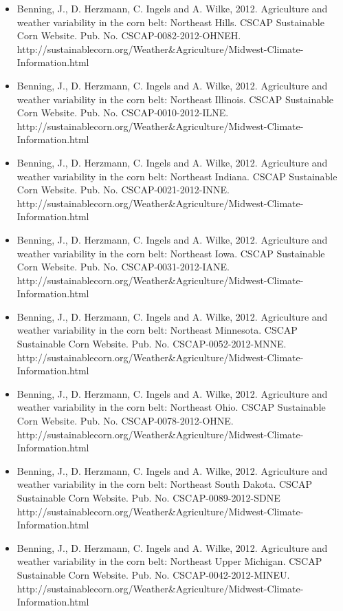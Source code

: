 \begin{itemize}
\item Benning, J., D. Herzmann, C. Ingels and A. Wilke, 2012. Agriculture and weather variability in the corn belt: Northeast Hills. CSCAP Sustainable Corn Website. Pub. No. CSCAP-0082-2012-OHNEH. http://sustainablecorn.org/Weather\&Agriculture/Midwest-Climate-Information.html

\item Benning, J., D. Herzmann, C. Ingels and A. Wilke, 2012. Agriculture and weather variability in the corn belt: Northeast Illinois. CSCAP Sustainable Corn Website. Pub. No. CSCAP-0010-2012-ILNE. http://sustainablecorn.org/Weather\&Agriculture/Midwest-Climate-Information.html

\item Benning, J., D. Herzmann, C. Ingels and A. Wilke, 2012. Agriculture and weather variability in the corn belt: Northeast Indiana. CSCAP Sustainable Corn Website. Pub. No. CSCAP-0021-2012-INNE. http://sustainablecorn.org/Weather\&Agriculture/Midwest-Climate-Information.html

\item Benning, J., D. Herzmann, C. Ingels and A. Wilke, 2012. Agriculture and weather variability in the corn belt: Northeast Iowa. CSCAP Sustainable Corn Website. Pub. No. CSCAP-0031-2012-IANE. http://sustainablecorn.org/Weather\&Agriculture/Midwest-Climate-Information.html

\item Benning, J., D. Herzmann, C. Ingels and A. Wilke, 2012. Agriculture and weather variability in the corn belt: Northeast Minnesota. CSCAP Sustainable Corn Website. Pub. No. CSCAP-0052-2012-MNNE. http://sustainablecorn.org/Weather\&Agriculture/Midwest-Climate-Information.html

\item Benning, J., D. Herzmann, C. Ingels and A. Wilke, 2012. Agriculture and weather variability in the corn belt: Northeast Ohio. CSCAP Sustainable Corn Website. Pub. No. CSCAP-0078-2012-OHNE. http://sustainablecorn.org/Weather\&Agriculture/Midwest-Climate-Information.html

\item Benning, J., D. Herzmann, C. Ingels and A. Wilke, 2012. Agriculture and weather variability in the corn belt: Northeast South Dakota. CSCAP Sustainable Corn Website. Pub. No. CSCAP-0089-2012-SDNE http://sustainablecorn.org/Weather\&Agriculture/Midwest-Climate-Information.html

\item Benning, J., D. Herzmann, C. Ingels and A. Wilke, 2012. Agriculture and weather variability in the corn belt: Northeast Upper Michigan. CSCAP Sustainable Corn Website. Pub. No. CSCAP-0042-2012-MINEU. http://sustainablecorn.org/Weather\&Agriculture/Midwest-Climate-Information.html


\end{itemize}
